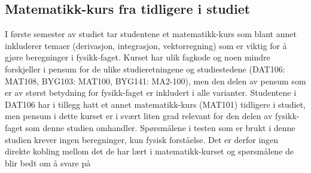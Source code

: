 \documentclass[a4paper,norsk,12pt]{report}
\begin{document}
\subsection{Matematikk-kurs fra tidligere i studiet}
I første semester av studiet tar studentene et matematikk-kurs som blant annet inkluderer temaer (derivasjon, integrasjon, vektorregning) som er viktig for å gjøre beregninger i fysikk-faget. Kurset har ulik fagkode og noen mindre forskjeller i pensum for de ulike studieretningene og studiestedene (DAT106: MAT108, BYG103: MAT100, BYG141: MA2-100), men den delen av pensum som er av størst betydning for fysikk-faget er inkludert i alle varianter. Studentene i DAT106 har i tillegg hatt et annet matematikk-kurs (MAT101) tidligere i studiet, men pensum i dette kurset er i svært liten grad relevant for den delen av fysikk-faget som denne studien omhandler. Spørsmålene i testen som er brukt i denne studien krever ingen beregninger, kun fysisk forståelse. Det er derfor ingen direkte kobling mellom det de har lært i matematikk-kurset og spørsmålene de blir bedt om å svare på
\end{document}
